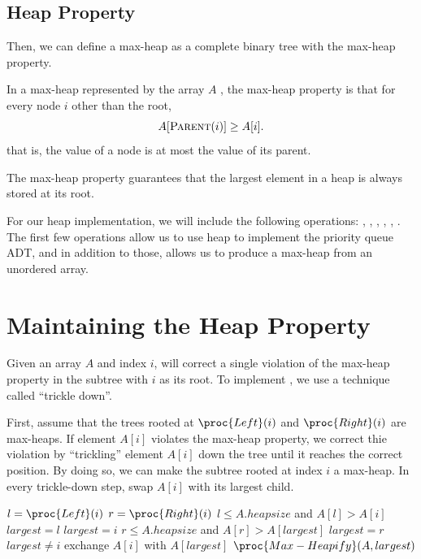 \subsection{Heap Property}

Then, we can define a max-heap as a complete binary tree with the max-heap property.

\begin{definition}  
    In a max-heap represented by the array $A$ , the max-heap property is that for every node $i$ other than the root,
    \[
        A[\textsc{Parent}(i)] \geq A[i]
    .\]
    that is, the value of a node is at most the value of its parent.
\end{definition}

The max-heap property guarantees that the largest element in a heap is always stored at its root.

For our heap implementation, we will include the following operations: , , , , , . The first few operations allow us to use heap to implement the priority queue ADT, and in addition to those,  allows us to produce a max-heap from an unordered array.

\section{Maintaining the Heap Property}

Given an array $A$ and index $i$,  will correct a single violation of the max-heap property in the subtree with $i$ as its root. To implement , we use a technique called ``trickle down''.

First, assume that the trees rooted at $\proc{Left}(i)$ and $\proc{Right}(i)$ are max-heaps. If element $A[i]$ violates the max-heap property, we correct thie violation by ``trickling'' element $A[i]$ down the tree until it reaches the correct position. By doing so, we can make the subtree rooted at index $i$ a max-heap. In every trickle-down step, swap $A[i]$ with its largest child.

\begin{codebox}
    \li $l = \proc{Left}(i)$
    \li $r = \proc{Right}(i)$ 
    \li \If $l \leq A.heapsize$ and $A[l] > A[i]$
    \li \Then $largest = l$
    \li \Else $largest = i$
    \End
    \li \If $r \leq A.heapsize$ and $A[r] > A[largest]$ 
    \li \Then $largest = r$
    \End
    \li \If $largest \neq i$
    \li \Then exchange $A[i]$ with $A[largest]$
    \li       $\proc{Max-Heapify}(A,largest)$
    \End 
\end{codebox}

